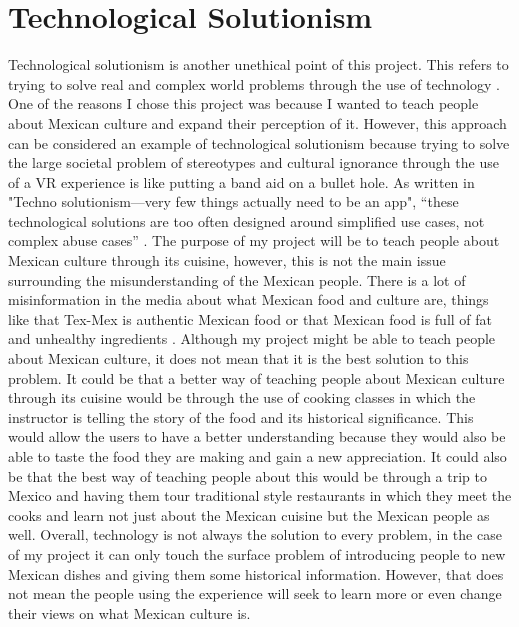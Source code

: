 \documentclass[11pt,twocolumn]{article}
\begin{document}
\section{Technological Solutionism}
Technological solutionism is another unethical point of this project. This refers to trying to solve real and complex world problems through the use of technology \cite{technosolutionism2021}. One of the reasons I chose this project was because I wanted to teach people about Mexican culture and expand their perception of it. However, this approach can be considered an example of technological solutionism because trying to solve the large societal problem of stereotypes and cultural ignorance through the use of a VR experience is like putting a band aid on a bullet hole. As written in "Techno solutionism—very few things actually need to be an app", “these technological solutions are too often designed around simplified use cases, not complex abuse cases” \cite{technosolutionism2021}. The purpose of my project will be to teach people about Mexican culture through its cuisine, however, this is not the main issue surrounding the misunderstanding of the Mexican people. There is a lot of misinformation in the media about what Mexican food and culture are, things like that Tex-Mex is authentic Mexican food or that Mexican food is full of fat and unhealthy ingredients \cite{mexstereotype2016}. Although my project might be able to teach people about Mexican culture, it does not mean that it is the best solution to this problem. It could be that a better way of teaching people about Mexican culture through its cuisine would be through the use of cooking classes in which the instructor is telling the story of the food and its historical significance. This would allow the users to have a better understanding because they would also be able to taste the food they are making and gain a new appreciation. It could also be that the best way of teaching people about this would be through a trip to Mexico and having them tour traditional style restaurants in which they meet the cooks and learn not just about the Mexican cuisine but the Mexican people as well. Overall, technology is not always the solution to every problem, in the case of my project it can only touch the surface problem of introducing people to new Mexican dishes and giving them some historical information. However, that does not mean the people using the experience will seek to learn more or even change their views on what Mexican culture is.  
\end{document}
